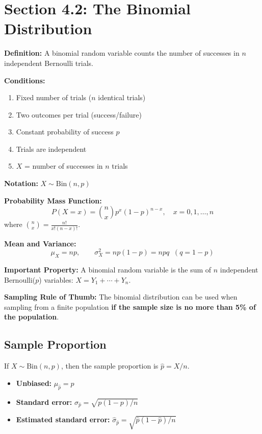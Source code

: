 \documentclass[11pt]{article}
\begin{document}
\section*{Section 4.2: The Binomial Distribution}
\textbf{Definition:} A binomial random variable counts the number of successes in \(n\) independent Bernoulli trials.

\textbf{Conditions:}
\begin{enumerate}[nosep]
    \item Fixed number of trials (\(n\) identical trials)
    \item Two outcomes per trial (success/failure)
    \item Constant probability of success \(p\)
    \item Trials are independent
    \item \(X\) = number of successes in \(n\) trials
\end{enumerate}

\textbf{Notation:} \(X \sim \text{Bin}(n,p)\)

\textbf{Probability Mass Function:}
\[
P(X=x) = \binom{n}{x} p^x (1-p)^{n-x},\quad x=0,1,\dots,n
\]
where \(\binom{n}{x} = \frac{n!}{x!(n-x)!}\).

\textbf{Mean and Variance:}
\[
\mu_X = np,\qquad \sigma_X^2 = np(1-p) = npq\;\;(q=1-p)
\]

\textbf{Important Property:} A binomial random variable is the sum of \(n\) independent Bernoulli(\(p\)) variables: \(X = Y_1 + \cdots + Y_n\).

\textbf{Sampling Rule of Thumb:} The binomial distribution can be used when sampling from a finite population \textbf{if the sample size is no more than 5\% of the population}.

\subsection*{Sample Proportion}
If \(X \sim \text{Bin}(n,p)\), then the sample proportion is \(\hat{p} = X/n\).
\begin{itemize}[nosep]
    \item \textbf{Unbiased:} \(\mu_{\hat{p}} = p\)
    \item \textbf{Standard error:} \(\sigma_{\hat{p}} = \sqrt{p(1-p)/n}\)
    \item \textbf{Estimated standard error:} \(\hat{\sigma}_{\hat{p}} = \sqrt{\hat{p}(1-\hat{p})/n}\)
\end{itemize}
\end{document}
